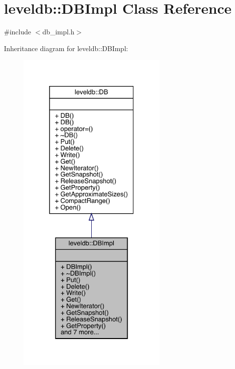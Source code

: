 \hypertarget{classleveldb_1_1_d_b_impl}{}\section{leveldb\+::D\+B\+Impl Class Reference}
\label{classleveldb_1_1_d_b_impl}


{\ttfamily \#include $<$db\+\_\+impl.\+h$>$}



Inheritance diagram for leveldb\+::D\+B\+Impl\+:
\nopagebreak
\begin{figure}[H]
\begin{center}
\leavevmode
\includegraphics[width=208pt]{classleveldb_1_1_d_b_impl__inherit__graph}
\end{center}
\end{figure}


